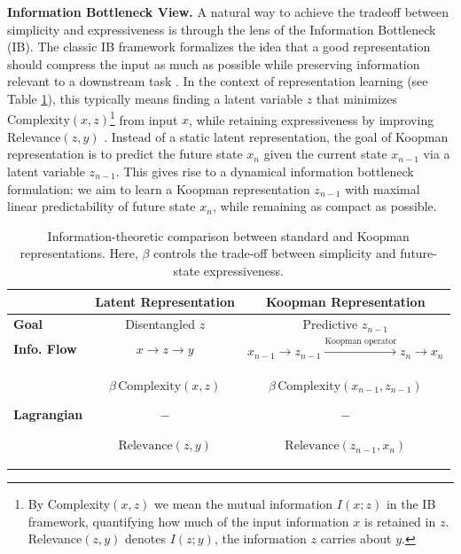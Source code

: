 \documentclass{article} %
\begin{document}
\textbf{Information Bottleneck View.} A natural way to achieve the tradeoff between simplicity and expressiveness is through the lens of the Information Bottleneck (IB). The classic IB framework formalizes the idea that a good representation should compress the input as much as possible while preserving information relevant to a downstream task \citep{tishby2000information, tishby2015deep}. In the context of representation learning (see Table \ref{tab:rep_comparison}), this typically means finding a latent variable $z$ that minimizes $\text{Complexity}(x, z)$\footnote{By Complexity$(x,z)$ we mean the mutual information $I(x;z)$ in the IB framework,  quantifying how much of the input information $x$ is retained in $z$. Relevance$(z,y)$ denotes $I(z;y)$, the information $z$ carries about $y$. } from input $x$, while retaining expressiveness by improving Relevance$(z, y)$ \citep{vera2018role}. Instead of a static latent representation, the goal of Koopman representation is to predict the future state $x_{n}$ given the current state $x_{n-1}$ via a latent variable $z_{n-1}$. This gives rise to a dynamical information bottleneck formulation: we aim to learn a Koopman representation $z_{n-1}$ with maximal linear predictability of future state $x_{n}$, while remaining as compact as possible.

\vspace{-0.5em}
\begin{table}[h]
\centering
\scriptsize
\renewcommand{\arraystretch}{0.99} 
\setlength{\tabcolsep}{8pt} 
\caption{
Information-theoretic comparison between standard and Koopman representations. Here, $\beta$ controls the trade-off between simplicity and future-state expressiveness.
}
\begin{tabular}{@{}lcc@{}}
\toprule
 & \textbf{Latent Representation} & \textbf{Koopman Representation} \\
 \hline
\textbf{Goal} 
  & Disentangled $z$ 
  & Predictive $z_{n-1}$ \\
\textbf{Info. Flow} 
  & $x \!\to\! z \!\to\! y$ 
  & $x_{n-1} \!\to\! z_{n-1} \xrightarrow{\text{Koopman operator}} z_{n} \!\to\! x_{n}$ \\
\textbf{Lagrangian} 
  & \colorbox{softred}{\strut $\beta \, \text{Complexity}(x, z)$} $-$ 
    \colorbox{softblue}{\strut $\text{Relevance}(z, y)$} 
  & \colorbox{softred}{\strut $\beta \, \text{Complexity}(x_{n-1}, z_{n-1})$} $-$ 
    \colorbox{softblue}{\strut $\text{Relevance}(z_{n-1}, x_{n})$} \\
\bottomrule
\end{tabular}
\label{tab:rep_comparison}
\vspace{-0.8em}
\end{table}
\end{document}
